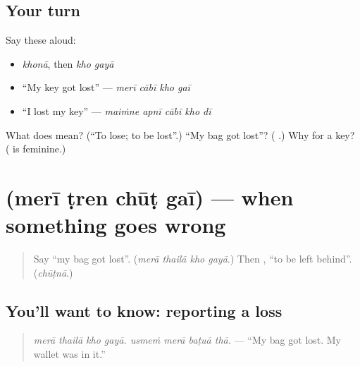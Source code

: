 \subsection*{Your turn}
Say these aloud:

\begin{itemize}
\raggedright
  \item \emph{khonā}, then \emph{kho gayā}
  \item \textquotedblleft{}My key got lost\textquotedblright{} — \emph{merī cābī kho gaī}
  \item \textquotedblleft{}I lost my key\textquotedblright{} — \emph{maiṁne apnī cābī kho dī}
\end{itemize}

\begin{tcolorbox}[breakable,colback=teal!4,colframe=teal!35!black,title={Before you move on}]
What does \textbf{} mean? (\textquotedblleft{}To lose; to be lost\textquotedblright{}.) \textquotedblleft{}My bag got lost\textquotedblright{}? (\textbf{   }.) Why \textbf{ } for a key? (\textbf{} is feminine.)
\end{tcolorbox}
\section[\texorpdfstring{\hi{मेरी} \hi{ट्रेन} \hi{छूट} \hi{गई} (merī ṭren chūṭ gaī)}{मेरी ट्रेन छूट गई (merī ṭren chūṭ gaī)}]{    (merī ṭren chūṭ gaī) — when something goes wrong}

\label{lesson:HI-C283-chutgayi}



\begin{quote}
Say \textquotedblleft{}my bag got lost\textquotedblright{}. (\emph{merā thailā kho gayā}.) Then \textbf{}, \textquotedblleft{}to be left behind\textquotedblright{}. (\emph{chūṭnā}.)
\end{quote}

\subsection*{You'll want to know: reporting a loss}
\begin{quote}
\textbf{       }
\end{quote}

\begin{quote}
\emph{merā thailā kho gayā. usmeṁ merā baṭuā thā.} — \textquotedblleft{}My bag got lost. My wallet was in it.\textquotedblright{}
\end{quote}

